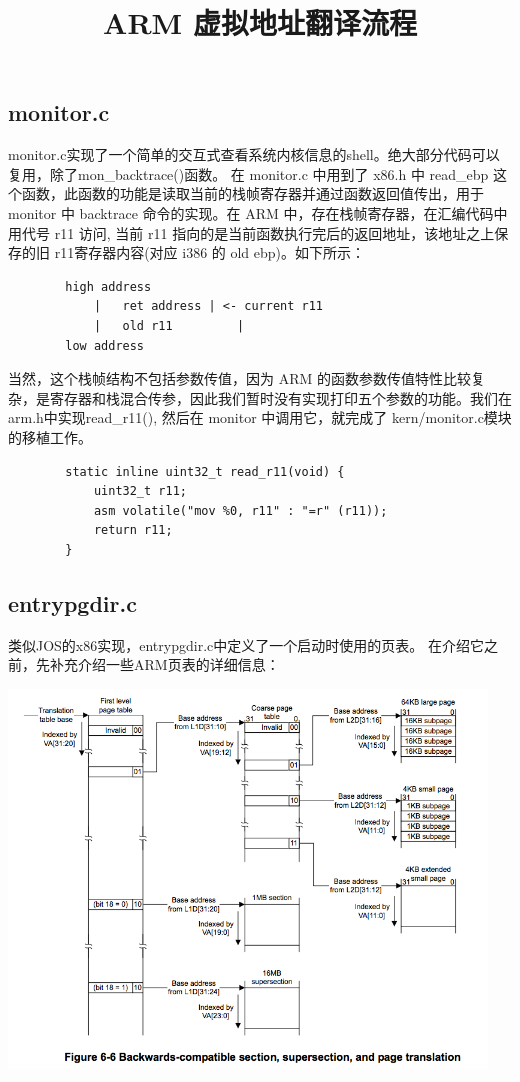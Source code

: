 \documentclass[11pt,a4paper]{article}
\begin{document}
\begin{CJK}{UTF8}{gkai}
	\subsection{monitor.c}
		monitor.c实现了一个简单的交互式查看系统内核信息的shell。绝大部分代码可以复用，除了mon\_backtrace()函数。
		在 monitor.c 中用到了 x86.h 中 read\_ebp 这个函数，此函数的功能是读取当前的栈帧寄存器并通过函数返回值传出，用于 monitor 中 backtrace 命令的实现。在 ARM 中，存在栈帧寄存器，在汇编代码中用代号 r11 访问, 当前 r11 指向的是当前函数执行完后的返回地址，该地址之上保存的旧 r11寄存器内容(对应 i386 的 old ebp)。如下所示：
		\begin{lstlisting}
		high address
			|	ret address	| <- current r11
			|	old r11			|
		low address
		\end{lstlisting}
		当然，这个栈帧结构不包括参数传值，因为 ARM 的函数参数传值特性比较复杂，是寄存器和栈混合传参，因此我们暂时没有实现打印五个参数的功能。我们在arm.h中实现read\_r11(), 然后在 monitor 中调用它，就完成了 kern/monitor.c模块的移植工作。
		\begin{lstlisting}
		static inline uint32_t read_r11(void) {
			uint32_t r11;
			asm volatile("mov %0, r11" : "=r" (r11));
			return r11;
		}
		\end{lstlisting}
	\subsection{entrypgdir.c}
		类似JOS的x86实现，entrypgdir.c中定义了一个启动时使用的页表。
		在介绍它之前，先补充介绍一些ARM页表的详细信息：

		\begin{center}
			\includegraphics[width=5in]{paging}
			\title{ARM 虚拟地址翻译流程}
		\end{center}
		

\end{CJK}
\end{document}
